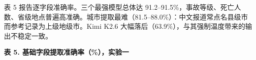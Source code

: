 \documentclass[11pt]{article}
\begin{document}
{\cjkfont 表} 5 {\cjkfont 报\allowbreak 告\allowbreak 逐\allowbreak 字\allowbreak 段\allowbreak 准\allowbreak 确\allowbreak 率\allowbreak 。\allowbreak 三\allowbreak 个\allowbreak 最\allowbreak 强\allowbreak 模\allowbreak 型\allowbreak 总\allowbreak 体\allowbreak 达} 91.2--91.5\%{\cjkfont ，\allowbreak 事\allowbreak 故\allowbreak 等\allowbreak 级\allowbreak 、\allowbreak 死\allowbreak 亡\allowbreak 人\allowbreak 数\allowbreak 、\allowbreak 省\allowbreak 级\allowbreak 地\allowbreak 点\allowbreak 普\allowbreak 遍\allowbreak 高\allowbreak 准\allowbreak 确\allowbreak 。\allowbreak 城\allowbreak 市\allowbreak 提\allowbreak 取\allowbreak 最\allowbreak 难\allowbreak （}81.5--88.0\%{\cjkfont ）\allowbreak ：\allowbreak 中\allowbreak 文\allowbreak 报\allowbreak 道\allowbreak 常\allowbreak 点\allowbreak 名\allowbreak 县\allowbreak 级\allowbreak 市\allowbreak 而\allowbreak 参\allowbreak 考\allowbreak 记\allowbreak 录\allowbreak 为\allowbreak 上\allowbreak 级\allowbreak 地\allowbreak 级\allowbreak 市\allowbreak 。}Kimi K2.6 {\cjkfont 大\allowbreak 幅\allowbreak 落\allowbreak 后\allowbreak （}63.9\%{\cjkfont ）\allowbreak ，\allowbreak 与\allowbreak 其\allowbreak 强\allowbreak 制\allowbreak 温\allowbreak 度\allowbreak 带\allowbreak 来\allowbreak 的\allowbreak 输\allowbreak 出\allowbreak 不\allowbreak 稳\allowbreak 定\allowbreak 一\allowbreak 致\allowbreak 。}

\textbf{{\cjkfont 表} 5. {\cjkfont 基\allowbreak 础\allowbreak 字\allowbreak 段\allowbreak 提\allowbreak 取\allowbreak 准\allowbreak 确\allowbreak 率\allowbreak （}\%{\cjkfont ）\allowbreak ，\allowbreak 实\allowbreak 验\allowbreak 一}}
\end{document}
